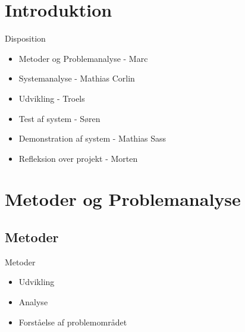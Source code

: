 \section{Introduktion}

\begin{frame}{Disposition}
\begin{itemize}
   \item Metoder og Problemanalyse - Marc
   \item Systemanalyse - Mathias Corlin
   \item Udvikling - Troels
   \item Test af system - Søren
   \item Demonstration af system - Mathias Sass
   \item Refleksion over projekt - Morten
\end{itemize}
\end{frame}

\section{Metoder og Problemanalyse}
\subsection{Metoder}
\begin{frame}{Metoder}
\begin{itemize}
   \item Udvikling
   \item Analyse
   \item Forståelse af problemområdet
\end{itemize}
\end{frame}


